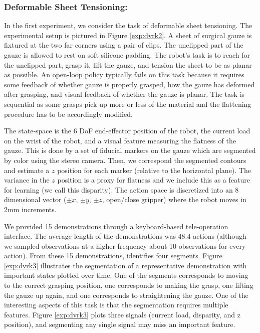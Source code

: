 \subsubsection{Deformable Sheet Tensioning: } In the first experiment, we consider the task of deformable sheet tensioning. The experimental setup is pictured in Figure \ref{exp:dvrk2}. A sheet of surgical gauze is fixtured at the two far corners using a pair of clips. The unclipped part of the gauze is allowed to rest on soft silicone padding. The robot's task is to reach for the unclipped part, grasp it, lift the gauze, and tension the sheet to be as planar as possible.
An open-loop policy typically fails on this task because it requires some feedback of whether gauze is properly grasped, how the gauze has deformed after grasping, and visual feedback of whether the gauze is planar.
The task is sequential as some grasps pick up more or less of the material and the flattening procedure has to be accordingly modified.

The state-space is the 6 DoF end-effector position of the robot, the current load on the wrist of the robot, and a visual feature measuring the flatness of the gauze.
This is done by a set of fiducial markers on the gauze which are segmented by color using the stereo camera.
Then, we correspond the segmented contours and estimate a $z$ position for each marker (relative to the horizontal plane).
The variance in the $z$ position is a proxy for flatness and we include this as a feature for learning (we call this disparity).
The action space is discretized into an 8 dimensional vector ($\pm x$, $\pm y$, $\pm z$, open/close gripper) where the robot moves in 2mm increments.

We provided 15 demonstrations through a keyboard-based tele-operation interface.
The average length of the demonstrations was 48.4 actions (although we sampled observations at a higher frequency about 10 observations for every action).
From these 15 demonstrations, \hirl identifies four segments. Figure \ref{exp:dvrk3} illustrates the segmentation of a representative demonstration with important states plotted over time.
One of the segments corresponds to moving to the correct grasping position, one corresponds to making the grasp, one lifting the gauze up again, and one corresponds to straightening the gauze.
One of the interesting aspects of this task is that the segmentation requires multiple features.
Figure \ref{exp:dvrk3} plots three signals (current load, disparity, and z position), and segmenting any single signal may miss an important feature. 

